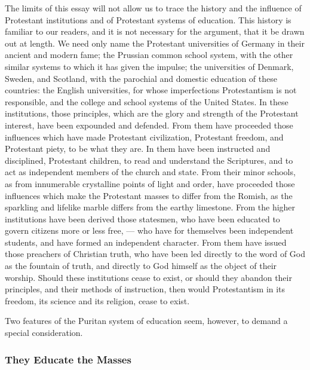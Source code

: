 \documentclass[]{book}
\begin{document}
The limits of this essay will not allow us to trace the history and the influence of Protestant institutions and of Protestant systems of education. This history is familiar to our readers, and it is not necessary for the argument, that it be drawn out at length. We need only name the Protestant universities of Germany in their ancient and modern fame; the Prussian common school system, with the other similar systems to which it has given the impulse; the universities of Denmark, Sweden, and Scotland, with the parochial and domestic education of these countries: the English universities, for whose imperfections Protestantism is not responsible, and the college and school systems of the United States. In these institutions, those principles, which are the glory and strength of the Protestant interest, have been expounded and defended. From them have proceeded those influences which have made Protestant civilization, Protestant freedom, and Protestant piety, to be what they are. In them have been instructed and disciplined, Protestant children, to read and understand the Scriptures, and to act as independent members of the church and state. From their minor schools, as from innumerable crystalline points of light and order, have proceeded those influences which make the Protestant masses to differ from the Romish, as the sparkling and lifelike marble differs from the earthy limestone. From the higher institutions have been derived those statesmen, who have been educated to govern citizens more or less free, --- who have for themselves been independent students, and have formed an independent character. From them have issued those preachers of Christian truth, who have been led directly to the word of God as the fountain of truth, and directly to God himself as the object of their worship. Should these institutions cease to exist, or should they abandon their principles, and their methods of instruction, then would Protestantism in its freedom, its science and its religion, cease to exist.

Two features of the Puritan system of education seem, however, to demand a special consideration.

\hypertarget{they-educate-the-masses}{%
\subsubsection{They Educate the Masses}\label{they-educate-the-masses}}
\end{document}
